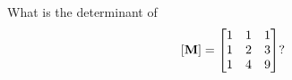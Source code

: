 \bexo
What is the determinant of 
\begin{equation}
\left[ \textbf{M} \right]=
\begin{bmatrix}
	1& 1& 1\\
1& 2& 3\\
1& 4& 9
\end{bmatrix} ?
\end{equation}
\eexo


